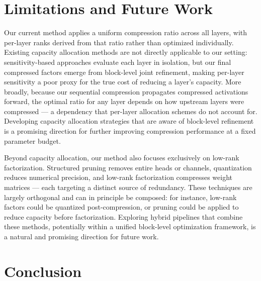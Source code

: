 \documentclass[10pt]{article} %
\theoremstyle{definition}
\theoremstyle{remark}
\begin{document}
\section{Limitations and Future Work}
\label{sec:limitations}

Our current method applies a uniform compression ratio across all layers, with per-layer ranks derived from that ratio rather than optimized individually.
Existing capacity allocation methods are not directly applicable to our setting: sensitivity-based approaches evaluate each layer in isolation, but our final compressed factors emerge from block-level joint refinement, making per-layer sensitivity a poor proxy for the true cost of reducing a layer's capacity.
More broadly, because our sequential compression propagates compressed activations forward, the optimal ratio for any layer depends on how upstream layers were compressed — a dependency that per-layer allocation schemes do not account for.
Developing capacity allocation strategies that are aware of block-level refinement is a promising direction for further improving compression performance at a fixed parameter budget.


Beyond capacity allocation, our method also focuses exclusively on low-rank factorization.
Structured pruning removes entire heads or channels, quantization reduces numerical precision, and low-rank factorization compresses weight matrices — each targeting a distinct source of redundancy.
These techniques are largely orthogonal and can in principle be composed: for instance, low-rank factors could be quantized post-compression, or pruning could be applied to reduce capacity before factorization.
Exploring hybrid pipelines that combine these methods, potentially within a unified block-level optimization framework, is a natural and promising direction for future work.

\section{Conclusion}
\label{sec:conclusion}
\end{document}
